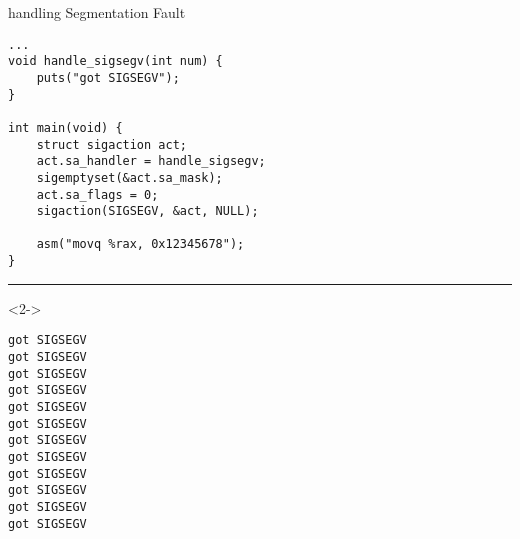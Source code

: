 \begin{frame}[fragile,label=handleSIGSEGV]{handling Segmentation Fault}
\lstset{language=C,style=smaller}
\begin{lstlisting}
...
void handle_sigsegv(int num) {
    puts("got SIGSEGV");
}

int main(void) {
    struct sigaction act;
    act.sa_handler = handle_sigsegv;
    sigemptyset(&act.sa_mask);
    act.sa_flags = 0;
    sigaction(SIGSEGV, &act, NULL);

    asm("movq %rax, 0x12345678");
}
\end{lstlisting}
\hrule
\begin{visibleenv}<2->
\begin{Verbatim}
got SIGSEGV
got SIGSEGV
got SIGSEGV
got SIGSEGV
got SIGSEGV
got SIGSEGV
got SIGSEGV
got SIGSEGV
got SIGSEGV
got SIGSEGV
got SIGSEGV
got SIGSEGV
\end{Verbatim}
\end{visibleenv}
\end{frame}

